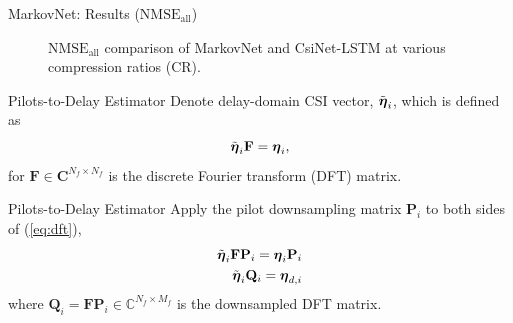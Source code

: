 \documentclass{beamer}
\begin{document}
  \begin{frame}{MarkovNet: Results ($\text{NMSE}_{\text{all}}$)}
    \begin{figure}[!hbtp] \centering 
      \vspace*{-3mm}
      \caption{$\text{NMSE}_{\text{all}}$ comparison of MarkovNet and CsiNet-LSTM 
      at various compression ratios (CR).} 
      \label{fig:diffnet_result} \vspace*{-2mm}
    \end{figure}  
  \end{frame}

  \begin{frame}{Pilots-to-Delay Estimator}
    Denote delay-domain CSI vector, $\tilde{\boldsymbol{\eta}}_i$, which is defined as
    \begin{equation}
      \tilde{\boldsymbol{\eta}}_{i}\mathbf{F} = \boldsymbol{\eta}_i, \label{eq:dft}
    \end{equation}
    for $\mathbf{F} \in \mathbf{C}^{N_f \times N_f}$ is the discrete Fourier transform (DFT) matrix.
  \end{frame}

  \begin{frame}{Pilots-to-Delay Estimator}
    Apply the pilot downsampling matrix $\mathbf{P}_i$ to both sides of (\ref{eq:dft}),
    \begin{align}
      \tilde{\boldsymbol{\eta}}_{i}\mathbf{F}\mathbf{P}_i = \boldsymbol{\eta}_i\mathbf{P}_i \nonumber \\
      \tilde{\boldsymbol{\eta}}_{i}\mathbf{Q}_i = \boldsymbol{\eta}_{d,i} \label{eq:qmat}
    \end{align}
    where $\mathbf{Q}_i=\mathbf{F}\mathbf{P}_i\in\mathbb{C}^{N_f\times M_f}$ is the downsampled DFT matrix.
  \end{frame}
\end{document}
